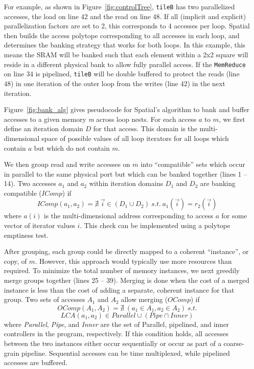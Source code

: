 For example, as shown in Figure~\ref{fig:controlTree}, \texttt{\small{tileB}} has two parallelized accesses, the load on line 42 and the read on line 48. If all (implicit and explicit) parallelization factors are set to 2, this corresponds to 4 accesses per loop. Spatial then builds the access polytope corresponding to all accesses in each loop, and determines the banking strategy that works for both loops. In this example, this means the SRAM will be banked such that each element within a 2x2 square will reside
in a different physical bank to allow fully parallel access. If the \texttt{\small{MemReduce}} on line 34 is pipelined, \texttt{\small{tileB}} will be double buffered to protect the reads (line 48) in one iteration of the outer loop
from the writes (line 42) in the next iteration.

Figure~\ref{fig:bank_alg} gives pseudocode for Spatial's algorithm to bank and buffer accesses to a given memory \emph{m} across loop nests. For each access $a$ to $m$, we first define an iteration domain $D$ for that access. This domain is the multi-dimensional space of possible values of all loop iterators for all loops which contain $a$ but which do not contain $m$.

We then group read and write accesses on $m$ into ``compatible'' sets which occur in parallel to the same physical port but which can be banked together (lines 1 -- 14).
Two accesses $a_1$ and $a_2$ within iteration domains $D_1$ and $D_2$
are banking compatible ($IComp$) if
\[ IComp(a_1,a_2) = \nexists~\vec{i} \in (D_1 \cup D_2) ~s.t.~a_1(\vec{i}) = r_2(\vec{i}) \]
where $a(i)$ is the multi-dimensional address corresponding to access $a$ for some vector of iterator values $i$.
This check can be implemented using a polytope emptiness test.

After grouping, each group could be directly mapped to a coherent ``instance'', or copy, of $m$.
However, this approach would typically use more resources than required. To minimize the total number of memory instances, we next greedily merge groups together (lines 25 -- 39). Merging is done when the cost of a merged instance is less than the cost of adding a separate, coherent instance for that group.
Two sets of accesses $A_1$ and $A_2$ allow merging ($OComp$) if
\[ OComp(A_1, A_2) = \nexists~ (a_1 \in A_1, a_2 \in A_2) ~s.t. \]
\[  LCA(a_1, a_2) \in Parallel \cup (Pipe \cap Inner) \]
where \emph{Parallel}, \emph{Pipe}, and \emph{Inner} are the set of Parallel, pipelined, and inner controllers in the program, respectively.
If this condition holds, all accesses between the two instances either occur sequentially or occur as part of a coarse-grain pipeline. Sequential accesses can be time multiplexed, while pipelined accesses are buffered.

